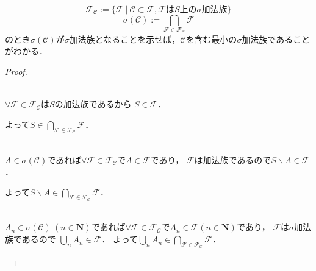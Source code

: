 \documentclass{jsarticle}
\begin{document}
\begin{itembox}[l]{}
\begin{equation}
    \mathcal{F}_{\mathcal{C}}:=\{\mathcal{F}\ |\ \mathcal{C}\subset\mathcal{F},\mathcal{F}は S 上の \sigma 加法族\}\nonumber
\end{equation}
\begin{equation}
    \sigma(\mathcal{C}):=\bigcap_{\mathcal{F}\in\mathcal{F}_{\mathcal{C}}}\mathcal{F} \nonumber
\end{equation}
のとき$\sigma(\mathcal{C})$が$\sigma$加法族となることを示せば，$\mathcal{C}$を含む最小の$\sigma$加法族であることがわかる．

\begin{proof}

\begin{description}
    \item
    \item[(1)]\mbox{}\\
    $\forall \mathcal{F}\in\mathcal{F}_{\mathcal{C}}$は$S$の加法族であるから
    $S\in\mathcal{F}$．\par
    よって$S\in \bigcap_{\mathcal{F}\in\mathcal{F}_{\mathcal{C}}}\mathcal{F}$．
    
    \item[(2)]\mbox{}\\
    $A\in \sigma(\mathcal{C})$であれば$\forall \mathcal{F}\in\mathcal{F}_{\mathcal{C}}$で$A\in \mathcal{F}$であり，    
    $\mathcal{F}$は加法族であるので$S\backslash A\in \mathcal{F}$．\par
    よって$S\backslash A\in \bigcap_{\mathcal{F}\in\mathcal{F}_{\mathcal{C}}}\mathcal{F}$．
    
    \item[(3)]\mbox{}\\
    $A_n\in \sigma(\mathcal{C})\ (n\in\mathbf{N})$であれば$\forall \mathcal{F}\in\mathcal{F}_{\mathcal{C}}$で$A_n\in \mathcal{F}(n\in\mathbf{N})$であり，
    $\mathcal{F}$は$\sigma$加法族であるので
    $\bigcup_{n} A_n\in\mathcal{F}$．
    よって$\bigcup_{n} A_n\in \bigcap_{\mathcal{F}\in\mathcal{F}_{\mathcal{C}}}\mathcal{F}$．
\end{description}

\end{proof}

\end{itembox}
\end{document}
